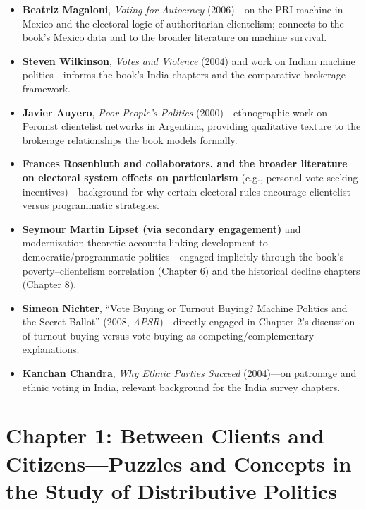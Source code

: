 \documentclass[12pt]{article}
\begin{document}
\begin{itemize}[leftmargin=*, itemsep=4pt]
    \item \textbf{Beatriz Magaloni}, \textit{Voting for Autocracy} (2006)---on the PRI machine in Mexico and the electoral logic of authoritarian clientelism; connects to the book's Mexico data and to the broader literature on machine survival.
    \item \textbf{Steven Wilkinson}, \textit{Votes and Violence} (2004) and work on Indian machine politics---informs the book's India chapters and the comparative brokerage framework.
    \item \textbf{Javier Auyero}, \textit{Poor People's Politics} (2000)---ethnographic work on Peronist clientelist networks in Argentina, providing qualitative texture to the brokerage relationships the book models formally.
    \item \textbf{Frances Rosenbluth and collaborators, and the broader literature on electoral system effects on particularism} (e.g., personal-vote-seeking incentives)---background for why certain electoral rules encourage clientelist versus programmatic strategies.
    \item \textbf{Seymour Martin Lipset (via secondary engagement)} and modernization-theoretic accounts linking development to democratic/programmatic politics---engaged implicitly through the book's poverty--clientelism correlation (Chapter 6) and the historical decline chapters (Chapter 8).
    \item \textbf{Simeon Nichter}, ``Vote Buying or Turnout Buying? Machine Politics and the Secret Ballot'' (2008, \textit{APSR})---directly engaged in Chapter 2's discussion of turnout buying versus vote buying as competing/complementary explanations.
    \item \textbf{Kanchan Chandra}, \textit{Why Ethnic Parties Succeed} (2004)---on patronage and ethnic voting in India, relevant background for the India survey chapters.
\end{itemize}

\section{Chapter 1: Between Clients and Citizens---Puzzles and Concepts in the Study of Distributive Politics}
\end{document}
